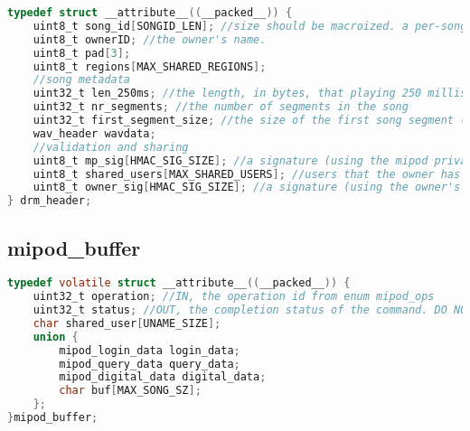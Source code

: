\documentclass[11pt]{extarticle}
\begin{document}
    \begin{lstlisting}[language=C, label={lst:cache}, style=manual_code]
typedef struct __attribute__((__packed__)) {
    uint8_t song_id[SONGID_LEN]; //size should be macroized. a per-song unique ID.
    uint8_t ownerID; //the owner's name.
    uint8_t pad[3];
    uint8_t regions[MAX_SHARED_REGIONS];
    //song metadata
    uint32_t len_250ms; //the length, in bytes, that playing 250 milliseconds of audio will take. (the polling interval while playing).
    uint32_t nr_segments; //the number of segments in the song
    uint32_t first_segment_size; //the size of the first song segment (which may not be the full SEGMENT_BUF_SIZE), INcluding trailer.
    wav_header wavdata;
    //validation and sharing
    uint8_t mp_sig[HMAC_SIG_SIZE]; //a signature (using the mipod private key) for all preceeding data
    uint8_t shared_users[MAX_SHARED_USERS]; //users that the owner has shared the song with.
    uint8_t owner_sig[HMAC_SIG_SIZE]; //a signature (using the owner's private key) for all preceeding data. resets whenever new user is shared with.
} drm_header;
    \end{lstlisting}

\subsection{mipod\_buffer}

    \begin{lstlisting}[language=C, label={lst:cache}, style=manual_code]
typedef volatile struct __attribute__((__packed__)) {
    uint32_t operation; //IN, the operation id from enum mipod_ops
    uint32_t status; //OUT, the completion status of the command. DO NOT read this field.
    char shared_user[UNAME_SIZE];
    union {
        mipod_login_data login_data;
        mipod_query_data query_data;
        mipod_digital_data digital_data;
        char buf[MAX_SONG_SZ];
    };
}mipod_buffer;
    \end{lstlisting}
    
\end{document}

